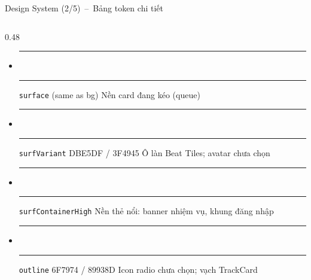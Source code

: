 \documentclass[aspectratio=169]{beamer}
\begin{document}
\begin{frame}{Design System (2/5)~--~Bảng token chi tiết}
\begin{columns}
\begin{column}{0.48\textwidth}
{\begin{itemize}
        \item \textcolor[HTML]{F5FBF7}{\rule[-2.5pt]{13pt}{13pt}}\,\textcolor[HTML]{0F1512}{\rule[-2.5pt]{13pt}{13pt}} \texttt{surface} (same as bg) \newline Nền card đang kéo (queue)
        \item \textcolor[HTML]{DBE5DF}{\rule[-2.5pt]{13pt}{13pt}}\,\textcolor[HTML]{3F4945}{\rule[-2.5pt]{13pt}{13pt}} \texttt{surfVariant} DBE5DF / 3F4945 \newline Ô làn Beat Tiles; avatar chưa chọn
        \item \textcolor[HTML]{E3EAE5}{\rule[-2.5pt]{13pt}{13pt}}\,\textcolor[HTML]{252B28}{\rule[-2.5pt]{13pt}{13pt}} \texttt{surfContainerHigh} \newline Nền thẻ nổi: banner nhiệm vụ, khung đăng nhập
        \item \textcolor[HTML]{6F7974}{\rule[-2.5pt]{13pt}{13pt}}\,\textcolor[HTML]{89938D}{\rule[-2.5pt]{13pt}{13pt}} \texttt{outline} 6F7974 / 89938D \newline Icon radio chưa chọn; vạch TrackCard
      \end{itemize}}\vspace{2mm}
    \end{column}
  \end{columns}
\end{frame}
\end{document}
